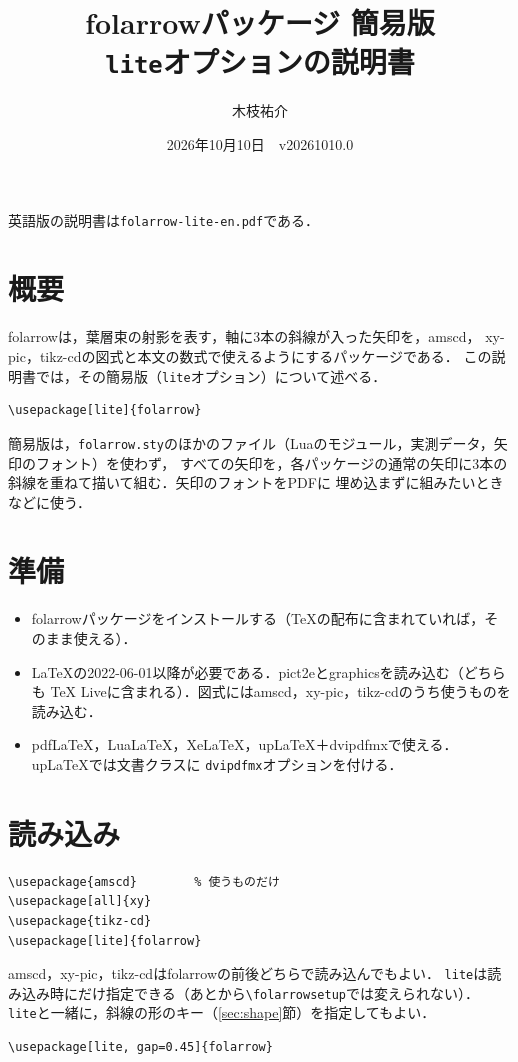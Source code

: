 \documentclass[dvipdfmx,paper=a4]{jlreq}
\title{folarrowパッケージ 簡易版\\\large \texttt{lite}オプションの説明書}
\author{木枝祐介}
\date{2026年10月10日　v20261010.0}
\newcommand\pkg[1]{\textsf{#1}}
\newcommand\file[1]{\texttt{#1}}
\begin{document}
\maketitle

\noindent 英語版の説明書は\file{folarrow-lite-en.pdf}である．

\section{概要}

\pkg{folarrow}は，葉層束の射影を表す，軸に3本の斜線が入った矢印を，\pkg{amscd}，
\pkg{xy-pic}，\pkg{tikz-cd}の図式と本文の数式で使えるようにするパッケージである．
この説明書では，その簡易版（\texttt{lite}オプション）について述べる．
\begin{Verbatim}
\usepackage[lite]{folarrow}
\end{Verbatim}
簡易版は，\file{folarrow.sty}のほかのファイル（Luaのモジュール，実測データ，矢印のフォント）を使わず，
すべての矢印を，各パッケージの通常の矢印に3本の斜線を重ねて描いて組む．矢印のフォントをPDFに
埋め込まずに組みたいときなどに使う．

\section{準備}

\begin{itemize}
\item \pkg{folarrow}パッケージをインストールする（\TeX{}の配布に含まれていれば，そのまま使える）．
\item \LaTeX{}の2022-06-01以降が必要である．\pkg{pict2e}と\pkg{graphics}を読み込む（どちらも
  \TeX{} Liveに含まれる）．図式には\pkg{amscd}，\pkg{xy-pic}，\pkg{tikz-cd}のうち使うものを読み込む．
\item pdf\LaTeX，Lua\LaTeX，Xe\LaTeX，up\LaTeX{}＋dvipdfmxで使える．up\LaTeX{}では文書クラスに
  \texttt{dvipdfmx}オプションを付ける．
\end{itemize}

\section{読み込み}

\begin{Verbatim}
\usepackage{amscd}        % 使うものだけ
\usepackage[all]{xy}
\usepackage{tikz-cd}
\usepackage[lite]{folarrow}
\end{Verbatim}
\pkg{amscd}，\pkg{xy-pic}，\pkg{tikz-cd}は\pkg{folarrow}の前後どちらで読み込んでもよい．
\texttt{lite}は読み込み時にだけ指定できる（あとから\verb|\folarrowsetup|では変えられない）．
\texttt{lite}と一緒に，斜線の形のキー（\ref{sec:shape}節）を指定してもよい．
\begin{Verbatim}
\usepackage[lite, gap=0.45]{folarrow}
\end{Verbatim}
\end{document}
